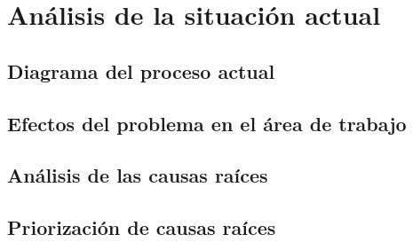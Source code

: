 
\section{Análisis de la situación actual}
\subsection{Diagrama del proceso actual}
\subsection{Efectos del problema en el área de trabajo}
\subsection{Análisis de las causas raíces}
\subsection{Priorización de causas raíces}